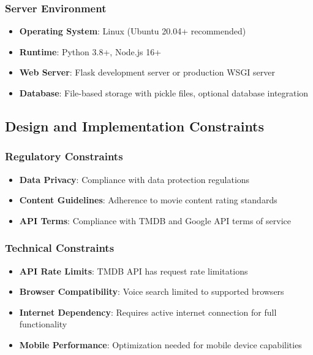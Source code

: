 \documentclass[12pt,a4paper]{article}
\begin{document}
\subsubsection{Server Environment}
\begin{itemize}
    \item \textbf{Operating System}: Linux (Ubuntu 20.04+ recommended)
    \item \textbf{Runtime}: Python 3.8+, Node.js 16+
    \item \textbf{Web Server}: Flask development server or production WSGI server
    \item \textbf{Database}: File-based storage with pickle files, optional database integration
\end{itemize}

\subsection{Design and Implementation Constraints}

\subsubsection{Regulatory Constraints}
\begin{itemize}
    \item \textbf{Data Privacy}: Compliance with data protection regulations
    \item \textbf{Content Guidelines}: Adherence to movie content rating standards
    \item \textbf{API Terms}: Compliance with TMDB and Google API terms of service
\end{itemize}

\subsubsection{Technical Constraints}
\begin{itemize}
    \item \textbf{API Rate Limits}: TMDB API has request rate limitations
    \item \textbf{Browser Compatibility}: Voice search limited to supported browsers
    \item \textbf{Internet Dependency}: Requires active internet connection for full functionality
    \item \textbf{Mobile Performance}: Optimization needed for mobile device capabilities
\end{itemize}
\end{document}
